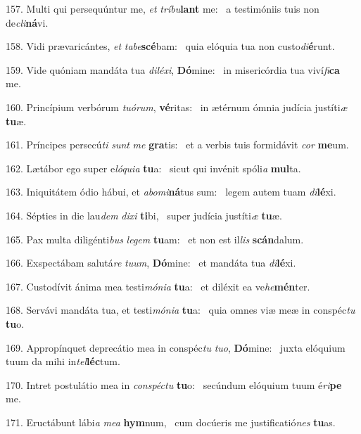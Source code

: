 157. Multi qui persequúntur me, \textit{et} \textit{trí}\textit{bu}\textbf{lant} me: \ast\  a testimóniis tuis non de\textit{cli}\textbf{ná}vi.\

158. Vidi prævaricántes, \textit{et} \textit{ta}\textit{be}\textbf{scé}bam: \ast\  quia elóquia tua non custo\textit{di}\textbf{é}runt.\

159. Vide quóniam mandáta tua \textit{di}\textit{lé}\textit{xi}, \textbf{Dó}mine: \ast\  in misericórdia tua viví\textit{fi}\textbf{ca} me.\

160. Princípium verbórum \textit{tu}\textit{ó}\textit{rum}, \textbf{vé}ritas: \ast\  in ætérnum ómnia judícia justíti\textit{æ} \textbf{tu}æ.\

161. Príncipes persecú\textit{ti} \textit{sunt} \textit{me} \textbf{gra}tis: \ast\  et a verbis tuis formidávit \textit{cor} \textbf{me}um.\

162. Lætábor ego super e\textit{ló}\textit{qui}\textit{a} \textbf{tu}a: \ast\  sicut qui invénit spóli\textit{a} \textbf{mul}ta.\

163. Iniquitátem ódio hábui, et \textit{ab}\textit{o}\textit{mi}\textbf{ná}tus sum: \ast\  legem autem tuam \textit{di}\textbf{lé}xi.\

164. Sépties in die lau\textit{dem} \textit{di}\textit{xi} \textbf{ti}bi, \ast\  super judícia justíti\textit{æ} \textbf{tu}æ.\

165. Pax multa diligénti\textit{bus} \textit{le}\textit{gem} \textbf{tu}am: \ast\  et non est il\textit{lis} \textbf{scán}dalum.\

166. Exspectábam salutá\textit{re} \textit{tu}\textit{um}, \textbf{Dó}mine: \ast\  et mandáta tua \textit{di}\textbf{lé}xi.\

167. Custodívit ánima mea testi\textit{mó}\textit{ni}\textit{a} \textbf{tu}a: \ast\  et diléxit ea ve\textit{he}\textbf{mén}ter.\

168. Servávi mandáta tua, et testi\textit{mó}\textit{ni}\textit{a} \textbf{tu}a: \ast\  quia omnes viæ meæ in conspéc\textit{tu} \textbf{tu}o.\

169. Appropínquet deprecátio mea in conspéc\textit{tu} \textit{tu}\textit{o}, \textbf{Dó}mine: \ast\  juxta elóquium tuum da mihi in\textit{tel}\textbf{léc}tum.\

170. Intret postulátio mea in \textit{con}\textit{spéc}\textit{tu} \textbf{tu}o: \ast\  secúndum elóquium tuum é\textit{ri}\textbf{pe} me.\

171. Eructábunt lábi\textit{a} \textit{me}\textit{a} \textbf{hym}num, \ast\  cum docúeris me justificatió\textit{nes} \textbf{tu}as.\

